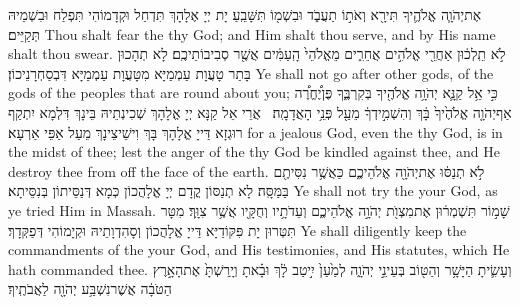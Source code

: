 {אֶת\maqqaf יְהֹוָ֧ה אֱלֹהֶ֛יךָ תִּירָ֖א וְאֹת֣וֹ תַעֲבֹ֑ד וּבִשְׁמ֖וֹ תִּשָּׁבֵֽעַ׃}
{יָת יְיָ אֶלָהָךְ תִּדְחַל וּקְדָמוֹהִי תִּפְלַח וּבִשְׁמֵיהּ תְּקַיֵּים׃}
{Thou shalt fear the \lord\space thy God; and Him shalt thou serve, and by His name shalt thou swear.}{}
{לֹ֣א תֵֽלְכ֔וּן אַחֲרֵ֖י אֱלֹהִ֣ים אֲחֵרִ֑ים מֵאֱלֹהֵי֙ הָֽעַמִּ֔ים אֲשֶׁ֖ר סְבִיבוֹתֵיכֶֽם׃}
{לָא תְהָכוּן בָּתַר טָעֲוָת עַמְמַיָּא מִטָּעֲוָת עַמְמַיָּא דִּבְסַחְרָנֵיכוֹן׃}
{Ye shall not go after other gods, of the gods of the peoples that are round about you;}{}
{כִּ֣י אֵ֥ל קַנָּ֛א יְהֹוָ֥ה אֱלֹהֶ֖יךָ בְּקִרְבֶּ֑ךָ פֶּן\maqqaf יֶ֠חֱרֶ֠ה אַף\maqqaf יְהֹוָ֤ה אֱלֹהֶ֙יךָ֙ בָּ֔ךְ וְהִשְׁמִ֣ידְךָ֔ מֵעַ֖ל פְּנֵ֥י הָאֲדָמָֽה׃ \setuma }
{אֲרֵי אֵל קַנָּא יְיָ אֱלָהָךְ שְׁכִינְתֵיהּ בֵּינָךְ דִּלְמָא יִתְקַף רוּגְזָא דַּייָ אֱלָהָךְ בָּךְ וִישֵׁיצֵינָךְ מֵעַל אַפֵּי אַרְעָא׃}
{for a jealous God, even the \lord\space thy God, is in the midst of thee; lest the anger of the \lord\space thy God be kindled against thee, and He destroy thee from off the face of the earth.}{}
{לֹ֣א תְנַסּ֔וּ אֶת\maqqaf יְהֹוָ֖ה אֱלֹהֵיכֶ֑ם כַּאֲשֶׁ֥ר נִסִּיתֶ֖ם בַּמַּסָּֽה׃}
{לָא תְנַסּוֹן קֳדָם יְיָ אֱלָהֲכוֹן כְּמָא דְּנַסֵּיתוֹן בְּנִסֵּיתָא׃}
{Ye shall not try the \lord\space your God, as ye tried Him in Massah.}{}
{שָׁמ֣וֹר תִּשְׁמְר֔וּן אֶת\maqqaf מִצְוֺ֖ת יְהֹוָ֣ה אֱלֹהֵיכֶ֑ם וְעֵדֹתָ֥יו וְחֻקָּ֖יו אֲשֶׁ֥ר צִוָּֽךְ׃}
{מִטָּר תִּטְּרוּן יָת פִּקּוֹדַיָּא דַּייָ אֱלָהֲכוֹן וְסָהִדְוָתֵיהּ וּקְיָמוֹהִי דְּפַקְּדָךְ׃}
{Ye shall diligently keep the commandments of the \lord\space your God, and His testimonies, and His statutes, which He hath commanded thee.}{}
{וְעָשִׂ֛יתָ הַיָּשָׁ֥ר וְהַטּ֖וֹב בְּעֵינֵ֣י יְהֹוָ֑ה לְמַ֙עַן֙ יִ֣יטַב לָ֔ךְ וּבָ֗אתָ וְיָֽרַשְׁתָּ֙ אֶת\maqqaf הָאָ֣רֶץ הַטֹּבָ֔ה אֲשֶׁר\maqqaf נִשְׁבַּ֥ע יְהֹוָ֖ה לַאֲבֹתֶֽיךָ׃}
